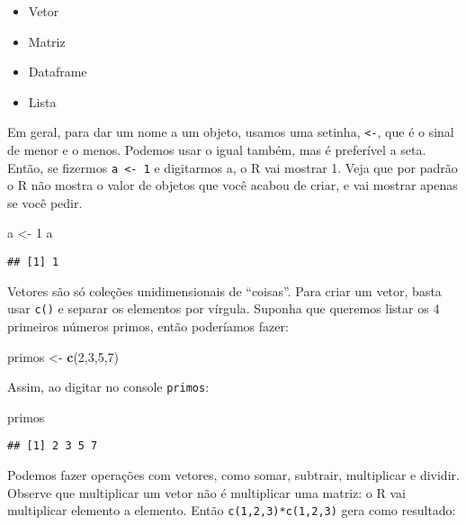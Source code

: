 \documentclass[]{book}
\newenvironment{Shaded}{\begin{snugshade}}{\end{snugshade}}
\newcommand{\KeywordTok}[1]{\textcolor[rgb]{0.13,0.29,0.53}{\textbf{#1}}}
\newcommand{\DecValTok}[1]{\textcolor[rgb]{0.00,0.00,0.81}{#1}}
\newcommand{\StringTok}[1]{\textcolor[rgb]{0.31,0.60,0.02}{#1}}
\newcommand{\NormalTok}[1]{#1}
\providecommand{\tightlist}{%
  \setlength{\itemsep}{0pt}\setlength{\parskip}{0pt}}
\begin{document}
\begin{itemize}
\tightlist
\item
  Vetor
\item
  Matriz
\item
  Dataframe
\item
  Lista
\end{itemize}

Em geral, para dar um nome a um objeto, usamos uma setinha,
\texttt{\textless{}-}, que é o sinal de menor e o menos. Podemos usar o
igual também, mas é preferível a seta. Então, se fizermos
\texttt{a\ \textless{}-\ 1} e digitarmos a, o R vai mostrar 1. Veja que
por padrão o R não mostra o valor de objetos que você acabou de criar, e
vai mostrar apenas se você pedir.

\begin{Shaded}
\begin{Highlighting}[]
\NormalTok{a <-}\StringTok{ }\DecValTok{1}
\NormalTok{a}
\end{Highlighting}
\end{Shaded}

\begin{verbatim}
## [1] 1
\end{verbatim}

Vetores são só coleções unidimensionais de ``coisas''. Para criar um
vetor, basta usar \texttt{c()} e separar os elementos por vírgula.
Suponha que queremos listar os 4 primeiros números primos, então
poderíamos fazer:

\begin{Shaded}
\begin{Highlighting}[]
\NormalTok{primos <-}\StringTok{ }\KeywordTok{c}\NormalTok{(}\DecValTok{2}\NormalTok{,}\DecValTok{3}\NormalTok{,}\DecValTok{5}\NormalTok{,}\DecValTok{7}\NormalTok{)}
\end{Highlighting}
\end{Shaded}

Assim, ao digitar no console \texttt{primos}:

\begin{Shaded}
\begin{Highlighting}[]
\NormalTok{primos}
\end{Highlighting}
\end{Shaded}

\begin{verbatim}
## [1] 2 3 5 7
\end{verbatim}

Podemos fazer operações com vetores, como somar, subtrair, multiplicar e
dividir. Observe que multiplicar um vetor não é multiplicar uma matriz:
o R vai multiplicar elemento a elemento. Então
\texttt{c(1,2,3)*c(1,2,3)} gera como resultado:
\end{document}
